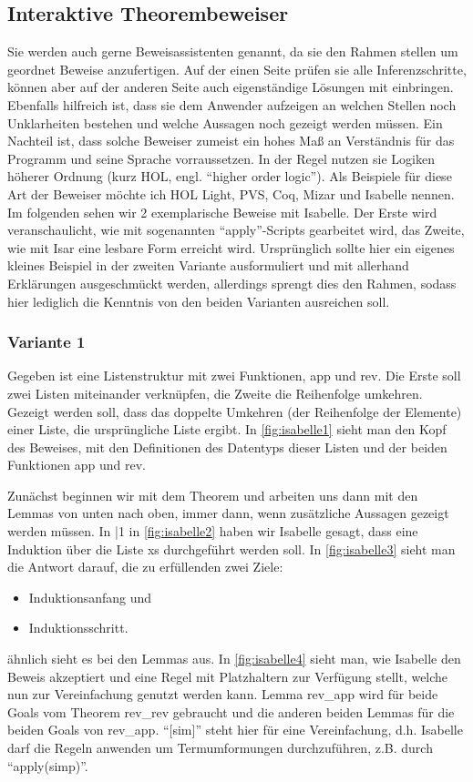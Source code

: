 \subsection{Interaktive Theorembeweiser}
Sie werden auch gerne Beweisassistenten genannt, da sie den Rahmen stellen um geordnet Beweise anzufertigen. Auf der einen Seite prüfen sie alle Inferenzschritte, können aber auf der anderen Seite auch eigenständige Lösungen mit einbringen. Ebenfalls hilfreich ist, dass sie dem Anwender aufzeigen an welchen Stellen noch Unklarheiten bestehen und welche Aussagen noch gezeigt werden müssen. Ein Nachteil ist, dass solche Beweiser zumeist ein hohes Maß an Verständnis für das Programm und seine Sprache vorraussetzen. In der Regel nutzen sie Logiken höherer Ordnung (kurz HOL, engl. \enquote{higher order logic}). Als Beispiele für diese Art der Beweiser möchte ich HOL Light, PVS, Coq, Mizar und Isabelle nennen.
Im folgenden sehen wir 2 exemplarische Beweise mit Isabelle. Der Erste wird veranschaulicht, wie mit sogenannten \enquote{apply}-Scripts gearbeitet wird, das Zweite, wie mit Isar eine lesbare Form erreicht wird.
Ursprünglich sollte hier ein eigenes kleines Beispiel in der zweiten Variante ausformuliert und mit allerhand Erklärungen ausgeschmückt werden, allerdings sprengt dies den Rahmen, sodass hier lediglich die Kenntnis von den beiden Varianten ausreichen soll.

\subsubsection*{Variante 1}
Gegeben ist eine Listenstruktur mit zwei Funktionen, app und rev. Die Erste soll zwei Listen miteinander verknüpfen, die Zweite die
Reihenfolge umkehren.
Gezeigt werden soll, dass das doppelte Umkehren (der Reihenfolge der Elemente) einer Liste, die ursprüngliche Liste ergibt.
In \cref{fig:isabelle1} sieht man den Kopf des Beweises, mit den Definitionen des Datentyps dieser Listen und der beiden Funktionen app und rev.

Zunächst beginnen wir mit dem Theorem und arbeiten uns dann mit den Lemmas von unten nach oben, immer dann, wenn zusätzliche Aussagen gezeigt werden müssen.
In |1 in \cref{fig:isabelle2} haben wir Isabelle gesagt, dass eine Induktion über die Liste xs durchgeführt werden soll. In \cref{fig:isabelle3} sieht man die Antwort darauf, die zu erfüllenden zwei Ziele:
\begin{itemize}
\item Induktionsanfang und
\item Induktionsschritt.
\end{itemize}
ähnlich sieht es bei den Lemmas aus.
In \cref{fig:isabelle4} sieht man, wie Isabelle den Beweis akzeptiert und eine Regel mit Platzhaltern zur Verfügung stellt, welche nun zur
Vereinfachung genutzt werden kann.
Lemma rev\_app wird für beide Goals vom Theorem rev\_rev gebraucht und die anderen beiden Lemmas für die beiden Goals von rev\_app. \enquote{[sim]} steht hier für eine Vereinfachung, d.h. Isabelle darf die Regeln anwenden um Termumformungen durchzuführen, z.B. durch \enquote{apply(simp)}.

